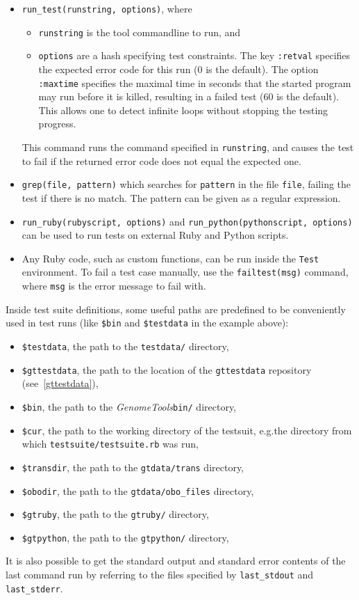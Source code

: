 \documentclass[11pt,final]{article}
\newcommand{\keyword}[1]{\lstinline{#1}}
\newcommand{\Gt}[0]{\emph{GenomeTools}\xspace}
\begin{document}
\begin{itemize}
\item
\keyword{run_test(runstring, options)}, where
\begin{itemize}
\item
\keyword{runstring} is the tool commandline to run, and
\item
\keyword{options} are a hash specifying test constraints.
The key \keyword{:retval} specifies the expected error code for this run (0 is
the default). The option \keyword{:maxtime} specifies the maximal time in
seconds that the started program may run before it is killed, resulting in a
failed test (60 is the default). This allows one to detect infinite loops
without stopping the testing progress.
\end{itemize}
This command runs the command specified in \keyword{runstring}, and causes the
test to fail if the returned error code does not equal the expected one.
\item
\keyword{grep(file, pattern)} which searches for \keyword{pattern} in the
file \keyword{file}, failing the test if there is no match. The pattern can be
given as a regular expression.
\item
\keyword{run_ruby(rubyscript, options)} and
\keyword{run_python(pythonscript, options)} can be used to run tests on
external Ruby and Python scripts.
\item
Any Ruby code, such as custom functions, can be run inside the \keyword{Test}
environment. To fail a test case manually, use the \keyword{failtest(msg)}
command, where \keyword{msg} is the error message to fail with.
\end{itemize}
Inside test suite definitions, some useful paths are predefined to be
conveniently used in test runs (like \keyword{$bin} and \keyword{$testdata} in
the example above):
\begin{itemize}
\item
\keyword{$testdata}, the path to the \keyword{testdata/} directory,
\item
\keyword{$gttestdata}, the path to the location of the \keyword{gttestdata}
repository (see~\ref{gttestdata}),
\item
\keyword{$bin}, the path to the \Gt \keyword{bin/} directory,
\item
\keyword{$cur}, the path to the working directory of the testsuit, e.g.\@ the
directory from which \keyword{testsuite/testsuite.rb} was run,
\item
\keyword{$transdir}, the path to the \keyword{gtdata/trans} directory,
\item
\keyword{$obodir}, the path to the \keyword{gtdata/obo_files} directory,
\item
\keyword{$gtruby}, the path to the \keyword{gtruby/} directory,
\item
\keyword{$gtpython}, the path to the \keyword{gtpython/} directory,
\end{itemize}
It is also possible to get the standard output and standard error contents of
the last command run by referring to the files specified by
\keyword{last_stdout} and \keyword{last_stderr}.
\end{document}
